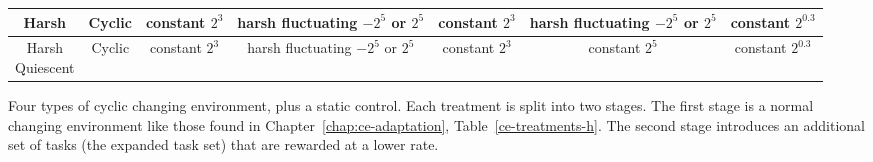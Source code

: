 \documentclass[PhD]{msu-thesis}
\begin{document}
\begin{table}[]
\begin{tabular}{|c|c||c|c||c|c|c|}
	Harsh & Cyclic & \makecell{constant \\ $2^3$} & \makecell{harsh \\ fluctuating \\ $-2^5$ or $2^5$} & \makecell{constant \\ $2^3$} & \makecell{harsh \\ fluctuating \\ $-2^5$ or $2^5$} & \makecell{constant \\ $2^{0.3}$} \\\hline
	\makecell{Harsh \\ Quiescent} & Cyclic & \makecell{constant \\ $2^3$} & \makecell{harsh \\ fluctuating \\ $-2^5$ or $2^5$} & \makecell{constant \\ $2^3$} & \makecell{constant \\ $2^5$} & \makecell{constant \\ $2^{0.3}$} \\\hline
	\end{tabular} 

	\begin{flushleft} Four types of cyclic changing environment, plus a static control. Each treatment is split into two stages. The first stage is a normal changing environment like those found in Chapter~\ref{chap:ce-adaptation}, Table~\ref{ce-treatments-h}. The second stage introduces an additional set of tasks (the expanded task set) that are rewarded at a lower rate.
	\end{flushleft}
	\label{cel-treatments-simple}
	\end{table}
\end{document}
